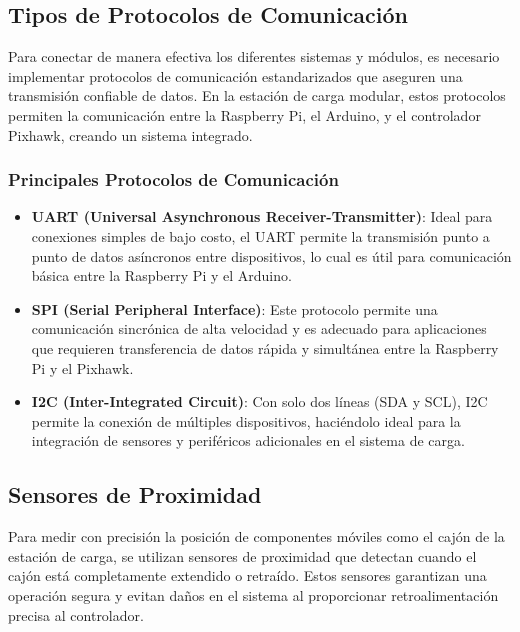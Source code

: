 \subsection{Tipos de Protocolos de Comunicación}

Para conectar de manera efectiva los diferentes sistemas y módulos, es necesario implementar protocolos de comunicación estandarizados que aseguren una transmisión confiable de datos. En la estación de carga modular, estos protocolos permiten la comunicación entre la Raspberry Pi, el Arduino, y el controlador Pixhawk, creando un sistema integrado.

\subsubsection{Principales Protocolos de Comunicación}
\begin{itemize}
    \item \textbf{UART (Universal Asynchronous Receiver-Transmitter)}: Ideal para conexiones simples de bajo costo, el UART permite la transmisión punto a punto de datos asíncronos entre dispositivos, lo cual es útil para comunicación básica entre la Raspberry Pi y el Arduino.
    \item \textbf{SPI (Serial Peripheral Interface)}: Este protocolo permite una comunicación sincrónica de alta velocidad y es adecuado para aplicaciones que requieren transferencia de datos rápida y simultánea entre la Raspberry Pi y el Pixhawk.
    \item \textbf{I2C (Inter-Integrated Circuit)}: Con solo dos líneas (SDA y SCL), I2C permite la conexión de múltiples dispositivos, haciéndolo ideal para la integración de sensores y periféricos adicionales en el sistema de carga.
\end{itemize}

\subsection{Sensores de Proximidad}

Para medir con precisión la posición de componentes móviles como el cajón de la estación de carga, se utilizan sensores de proximidad que detectan cuando el cajón está completamente extendido o retraído. Estos sensores garantizan una operación segura y evitan daños en el sistema al proporcionar retroalimentación precisa al controlador.

